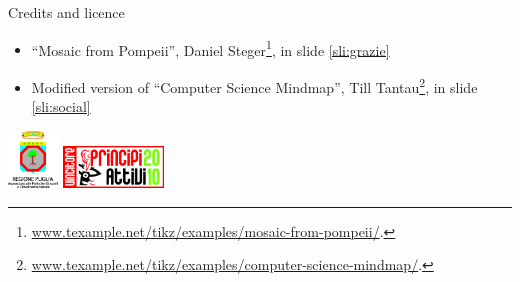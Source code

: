 \documentclass[xcolor=svgnames]{beamer}
\begin{document}

		\begin{frame}{Credits and licence}
			\begin{center}
				\Huge{\ccbyncsa}
			\end{center}
			\vfill
			\begin{itemize}
				\item ``Mosaic from Pompeii'', Daniel Steger\footnote{\url{www.texample.net/tikz/examples/mosaic-from-pompeii/}.}, in slide \ref{sli:grazie}
				\item Modified version of ``Computer Science Mindmap'', Till Tantau\footnote{\url{www.texample.net/tikz/examples/computer-science-mindmap/}.}, in slide \ref{sli:social}
			\end{itemize}
			\vfill
			\includegraphics[width=0.1\textwidth]{img/logoreg_1}
			\hfill
			\includegraphics[width=0.2\textwidth]{img/logoreg_2}
		\end{frame}
\end{document}
